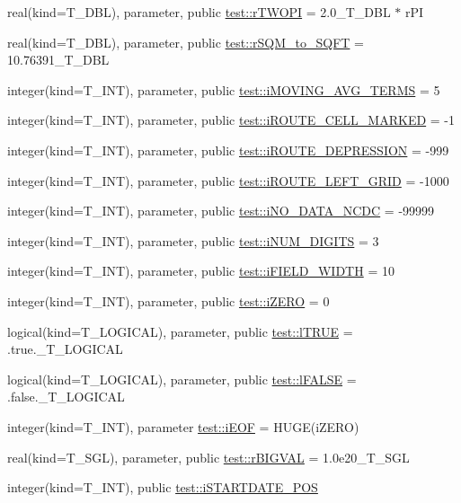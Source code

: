 \begin{DoxyCompactItemize}
real(kind=T\_\-DBL), parameter, public \hyperlink{namespacetest_a28a64e68af4df21c5a1c16a3dad0a400}{test::rTWOPI} = 2.0\_\-T\_\-DBL $\ast$ rPI
\item 
real(kind=T\_\-DBL), parameter, public \hyperlink{namespacetest_a3f71bffc4ddb3031cb85b1bbd0731823}{test::rSQM\_\-to\_\-SQFT} = 10.76391\_\-T\_\-DBL
\item 
integer(kind=T\_\-INT), parameter, public \hyperlink{namespacetest_a01d23f78fddde9b4d7918751ce961815}{test::iMOVING\_\-AVG\_\-TERMS} = 5
\item 
integer(kind=T\_\-INT), parameter, public \hyperlink{namespacetest_a0b4633c7ece605f3f9e541d1bb6068b1}{test::iROUTE\_\-CELL\_\-MARKED} = -\/1
\item 
integer(kind=T\_\-INT), parameter, public \hyperlink{namespacetest_a238a0131e776ca1d31fb18253d86fdbe}{test::iROUTE\_\-DEPRESSION} = -\/999
\item 
integer(kind=T\_\-INT), parameter, public \hyperlink{namespacetest_a828d11529416772ecac92d8ca31c2056}{test::iROUTE\_\-LEFT\_\-GRID} = -\/1000
\item 
integer(kind=T\_\-INT), parameter, public \hyperlink{namespacetest_a751d31358c9620f1549f1428a6a12835}{test::iNO\_\-DATA\_\-NCDC} = -\/99999
\item 
integer(kind=T\_\-INT), parameter, public \hyperlink{namespacetest_a9f880ad69dfceb22317f4bd514f70921}{test::iNUM\_\-DIGITS} = 3
\item 
integer(kind=T\_\-INT), parameter, public \hyperlink{namespacetest_a0255f32e18a217bf4bc1cc1ebf08a8ad}{test::iFIELD\_\-WIDTH} = 10
\item 
integer(kind=T\_\-INT), parameter, public \hyperlink{namespacetest_a3014c474a511a7853327d17f396fea73}{test::iZERO} = 0
\item 
logical(kind=T\_\-LOGICAL), parameter, public \hyperlink{namespacetest_ab7046de13f01778d86667e4266521664}{test::lTRUE} = .true.\_\-T\_\-LOGICAL
\item 
logical(kind=T\_\-LOGICAL), parameter, public \hyperlink{namespacetest_ad44869e0204417021792170cd610ee25}{test::lFALSE} = .false.\_\-T\_\-LOGICAL
\item 
integer(kind=T\_\-INT), parameter \hyperlink{namespacetest_a3d9d5da4779988c8ab638ff80ee1d75e}{test::iEOF} = HUGE(iZERO)
\item 
real(kind=T\_\-SGL), parameter, public \hyperlink{namespacetest_ac6f2875c79f3dc5f3058945c798787da}{test::rBIGVAL} = 1.0e20\_\-T\_\-SGL
\item 
integer(kind=T\_\-INT), public \hyperlink{namespacetest_ac53c64b203e8d99ae558218e98beef9d}{test::iSTARTDATE\_\-POS}

\end{DoxyCompactItemize}
